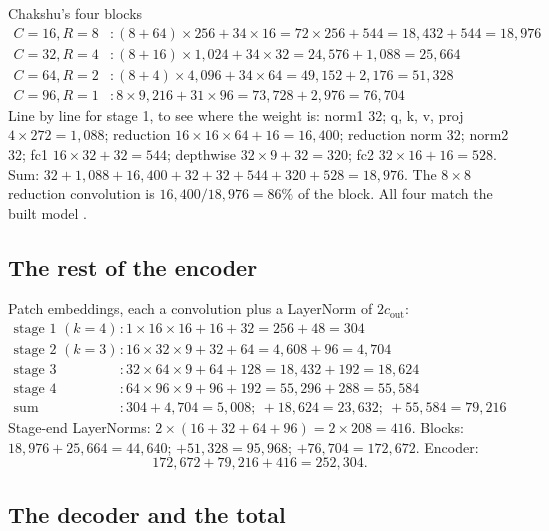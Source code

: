 \begin{worked}[label={we:chakshu:blocks}]{Chakshu's four blocks}
\begin{align*}
C=16,R=8 &: (8+64)\times256+34\times16 = 72\times256+544 = 18{,}432+544 = 18{,}976\\
C=32,R=4 &: (8+16)\times1{,}024+34\times32 = 24{,}576+1{,}088 = 25{,}664\\
C=64,R=2 &: (8+4)\times4{,}096+34\times64 = 49{,}152+2{,}176 = 51{,}328\\
C=96,R=1 &: 8\times9{,}216+31\times96 = 73{,}728+2{,}976 = 76{,}704
\end{align*}
Line by line for stage 1, to see where the weight is: norm1 32; q, k, v, proj $4\times272=1{,}088$; reduction
$16\times16\times64+16=16{,}400$; reduction norm 32; norm2 32; fc1 $16\times32+32=544$; depthwise $32\times9+32=320$;
fc2 $32\times16+16=528$. Sum: $32+1{,}088+16{,}400+32+32+544+320+528=18{,}976$. The $8\times8$ reduction convolution
is $16{,}400/18{,}976=86\%$ of the block. All four match the built model \tagC.
\end{worked}

\subsection{The rest of the encoder}

Patch embeddings, each a convolution plus a LayerNorm of $2c_\text{out}$:
\begin{align*}
\text{stage 1 } (k=4) &: 1\times16\times16+16+32 = 256+48 = 304\\
\text{stage 2 } (k=3) &: 16\times32\times9+32+64 = 4{,}608+96 = 4{,}704\\
\text{stage 3} &: 32\times64\times9+64+128 = 18{,}432+192 = 18{,}624\\
\text{stage 4} &: 64\times96\times9+96+192 = 55{,}296+288 = 55{,}584\\
\text{sum} &: 304+4{,}704 = 5{,}008;\ +18{,}624 = 23{,}632;\ +55{,}584 = 79{,}216
\end{align*}
Stage-end LayerNorms: $2\times(16+32+64+96)=2\times208=416$. Blocks: $18{,}976+25{,}664=44{,}640$;
$+51{,}328=95{,}968$; $+76{,}704=172{,}672$. Encoder:
\[
172{,}672+79{,}216+416 = 252{,}304 .
\]

\subsection{The decoder and the total}

